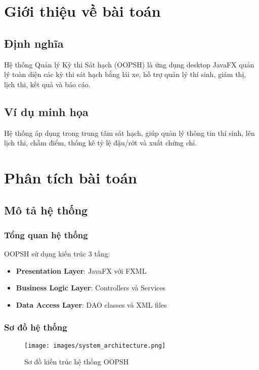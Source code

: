 \documentclass[12pt,a4paper]{article}
\begin{document}
\tableofcontents
\newpage

\section{Giới thiệu về bài toán}

\subsection{Định nghĩa}

Hệ thống Quản lý Kỳ thi Sát hạch (OOPSH) là ứng dụng desktop JavaFX quản lý toàn diện các kỳ thi sát hạch bằng lái xe, hỗ trợ quản lý thí sinh, giám thị, lịch thi, kết quả và báo cáo.

\subsection{Ví dụ minh họa}

Hệ thống áp dụng trong trung tâm sát hạch, giúp quản lý thông tin thí sinh, lên lịch thi, chấm điểm, thống kê tỷ lệ đậu/rớt và xuất chứng chỉ.

\section{Phân tích bài toán}

\subsection{Mô tả hệ thống}

\subsubsection{Tổng quan hệ thống}

OOPSH sử dụng kiến trúc 3 tầng:
\begin{itemize}
    \item \textbf{Presentation Layer}: JavaFX với FXML
    \item \textbf{Business Logic Layer}: Controllers và Services  
    \item \textbf{Data Access Layer}: DAO classes và XML files
\end{itemize}

\subsubsection{Sơ đồ hệ thống}

\begin{figure}[H]
\centering
\texttt{[image: images/system\_architecture.png]}
\caption{Sơ đồ kiến trúc hệ thống OOPSH}
\label{fig:system_architecture}
\end{figure}
\end{document}
